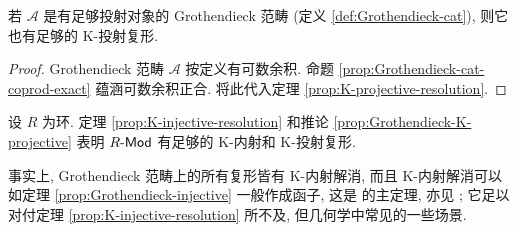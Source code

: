 \begin{corollary}\label{prop:Grothendieck-K-projective}
	若 $\mathcal{A}$ 是有足够投射对象的 Grothendieck 范畴 (定义 \ref{def:Grothendieck-cat}), 则它也有足够的 K-投射复形.
\end{corollary}
\begin{proof}
	Grothendieck 范畴 $\mathcal{A}$ 按定义有可数余积. 命题 \ref{prop:Grothendieck-cat-coprod-exact} 蕴涵可数余积正合. 将此代入定理 \ref{prop:K-projective-resolution}.
\end{proof}

\begin{example}\label{eg:Mod-K-injectives}
	设 $R$ 为环. 定理 \ref{prop:K-injective-resolution} 和推论 \ref{prop:Grothendieck-K-projective} 表明 $R\text{-}\mathsf{Mod}$ 有足够的 K-内射和 K-投射复形.
\end{example}

事实上, Grothendieck 范畴上的所有复形皆有 K-内射解消, 而且 K-内射解消可以如定理 \ref{prop:Grothendieck-injective} 一般作成函子, 这是 \cite{Serp03} 的主定理, 亦见 \cite[Tag 079P]{stacks}; 它足以对付定理 \ref{prop:K-injective-resolution} 所不及, 但几何学中常见的一些场景.

